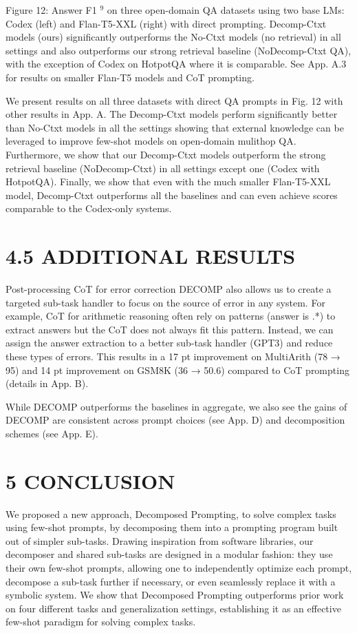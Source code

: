 \documentclass[
]{article}
\begin{document}
Figure 12: Answer F1 \(^{9}\) on three open-domain QA datasets using two
base LMs: Codex (left) and Flan-T5-XXL (right) with direct prompting.
Decomp-Ctxt models (ours) significantly outperforms the No-Ctxt models
(no retrieval) in all settings and also outperforms our strong retrieval
baseline (NoDecomp-Ctxt QA), with the exception of Codex on HotpotQA
where it is comparable. See App. A.3 for results on smaller Flan-T5
models and CoT prompting.

We present results on all three datasets with direct QA prompts in Fig.
12 with other results in App. A. The Decomp-Ctxt models perform
significantly better than No-Ctxt models in all the settings showing
that external knowledge can be leveraged to improve few-shot models on
open-domain mulithop QA. Furthermore, we show that our Decomp-Ctxt
models outperform the strong retrieval baseline (NoDecomp-Ctxt) in all
settings except one (Codex with HotpotQA). Finally, we show that even
with the much smaller Flan-T5-XXL model, Decomp-Ctxt outperforms all the
baselines and can even achieve scores comparable to the Codex-only
systems.

\section{4.5 ADDITIONAL RESULTS}\label{additional-results}

Post-processing CoT for error correction DECOMP also allows us to create
a targeted sub-task handler to focus on the source of error in any
system. For example, CoT for arithmetic reasoning often rely on patterns
(answer is .*) to extract answers but the CoT does not always fit this
pattern. Instead, we can assign the answer extraction to a better
sub-task handler (GPT3) and reduce these types of errors. This results
in a 17 pt improvement on MultiArith (78 → 95) and 14 pt improvement on
GSM8K (36 → 50.6) compared to CoT prompting (details in App. B).

While DECOMP outperforms the baselines in aggregate, we also see the
gains of DECOMP are consistent across prompt choices (see App. D) and
decomposition schemes (see App. E).

\section{5 CONCLUSION}\label{conclusion}

We proposed a new approach, Decomposed Prompting, to solve complex tasks
using few-shot prompts, by decomposing them into a prompting program
built out of simpler sub-tasks. Drawing inspiration from software
libraries, our decomposer and shared sub-tasks are designed in a modular
fashion: they use their own few-shot prompts, allowing one to
independently optimize each prompt, decompose a sub-task further if
necessary, or even seamlessly replace it with a symbolic system. We show
that Decomposed Prompting outperforms prior work on four different tasks
and generalization settings, establishing it as an effective few-shot
paradigm for solving complex tasks.
\end{document}
